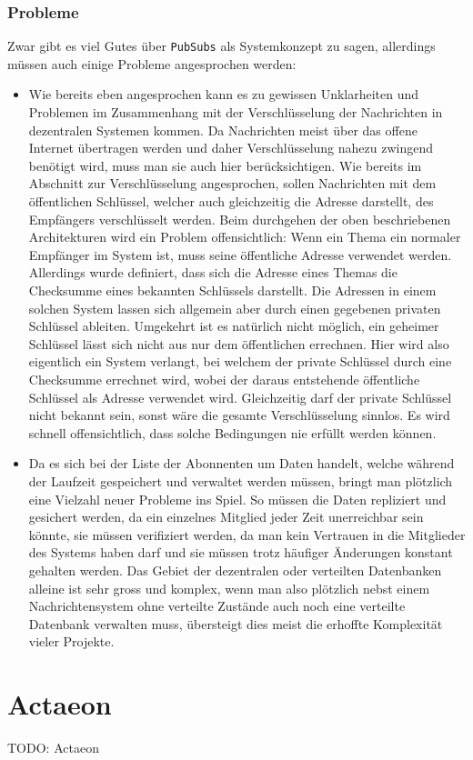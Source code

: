 \documentclass[11pt]{article}
\begin{document}
\subsubsection{Probleme}
\label{sec:org36792f5}
Zwar gibt es viel Gutes über \texttt{PubSubs} als Systemkonzept zu sagen,
allerdings müssen auch einige Probleme angesprochen werden:
\begin{itemize}
\item Wie bereits eben angesprochen kann es zu gewissen Unklarheiten und
Problemen im Zusammenhang mit der Verschlüsselung der Nachrichten in
dezentralen Systemen kommen. Da Nachrichten meist über das offene
Internet übertragen werden und daher Verschlüsselung nahezu zwingend
benötigt wird, muss man sie auch hier berücksichtigen. Wie bereits
im Abschnitt zur Verschlüsselung angesprochen, sollen Nachrichten
mit dem öffentlichen Schlüssel, welcher auch gleichzeitig die
Adresse darstellt, des Empfängers verschlüsselt werden. Beim
durchgehen der oben beschriebenen Architekturen wird ein Problem
offensichtlich: Wenn ein Thema ein normaler Empfänger im System ist,
muss seine öffentliche Adresse verwendet werden. Allerdings wurde
definiert, dass sich die Adresse eines Themas die Checksumme eines
bekannten Schlüssels darstellt. Die Adressen in einem solchen System
lassen sich allgemein aber durch einen gegebenen privaten Schlüssel
ableiten. Umgekehrt ist es natürlich nicht möglich, ein geheimer
Schlüssel lässt sich nicht aus nur dem öffentlichen errechnen. Hier
wird also eigentlich ein System verlangt, bei welchem der private
Schlüssel durch eine Checksumme errechnet wird, wobei der daraus
entstehende öffentliche Schlüssel als Adresse verwendet wird.
Gleichzeitig darf der private Schlüssel nicht bekannt sein, sonst
wäre die gesamte Verschlüsselung sinnlos. Es wird schnell
offensichtlich, dass solche Bedingungen nie erfüllt werden können.
\item Da es sich bei der Liste der Abonnenten um Daten handelt, welche
während der Laufzeit gespeichert und verwaltet werden müssen, bringt
man plötzlich eine Vielzahl neuer Probleme ins Spiel. So müssen die
Daten repliziert und gesichert werden, da ein einzelnes Mitglied
jeder Zeit unerreichbar sein könnte, sie müssen verifiziert werden,
da man kein Vertrauen in die Mitglieder des Systems haben darf und
sie müssen trotz häufiger Änderungen konstant gehalten werden. Das
Gebiet der dezentralen oder verteilten Datenbanken alleine ist sehr
gross und komplex, wenn man also plötzlich nebst einem
Nachrichtensystem ohne verteilte Zustände auch noch eine verteilte
Datenbank verwalten muss, übersteigt dies meist die erhoffte
Komplexität vieler Projekte.
\end{itemize}
\section{Actaeon}
\label{sec:orgc0a9525}
TODO: Actaeon
\end{document}
